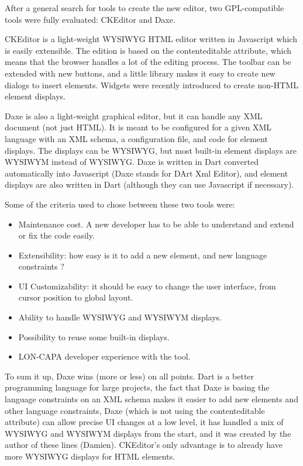 After a general search for tools to create the new editor, two GPL-compatible tools were fully evaluated: CKEditor and Daxe.

CKEditor is a light-weight WYSIWYG HTML editor written in Javascript which is easily extensible. The edition is based on the contenteditable attribute, which means that the browser handles a lot of the editing process. The toolbar can be extended with new buttons, and a little library makes it easy to create new dialogs to insert elements. Widgets were recently introduced to create non-HTML element displays.

Daxe is also a light-weight graphical editor, but it can handle any XML document (not just HTML). It is meant to be configured for a given XML language with an XML schema, a configuration file, and code for element displays. The displays can be WYSIWYG, but most built-in element displays are WYSIWYM instead of WYSIWYG. Daxe is written in Dart converted automatically into Javascript (Daxe stands for DArt Xml Editor), and element displays are also written in Dart (although they can use Javascript if necessary).

Some of the criteria used to chose between these two tools were:
\begin{itemize}
\item Maintenance cost. A new developer has to be able to understand and extend or fix the code easily.
\item Extensibility: how easy is it to add a new element, and new language constraints ?
\item UI Customizability: it should be easy to change the user interface, from cursor position to global layout.
\item Ability to handle WYSIWYG and WYSIWYM displays.
\item Possibility to reuse some built-in displays.
\item LON-CAPA developer experience with the tool.
\end{itemize}

To sum it up, Daxe wins (more or less) on all points. Dart is a better programming language for large projects, the fact that Daxe is basing the language constraints on an XML schema makes it easier to add new elements and other language constraints, Daxe (which is not using the contenteditable attribute) can allow precise UI changes at a low level, it has handled a mix of WYSIWYG and WYSIWYM displays from the start, and it was created by the author of these lines (Damien). CKEditor's only advantage is to already have more WYSIWYG displays for HTML elements.


